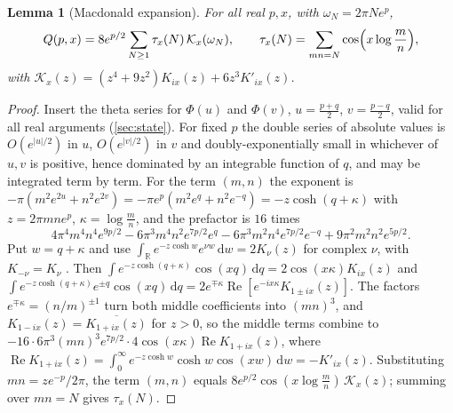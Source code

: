 \documentclass[11pt]{article}
\newtheorem{lemma}[theorem]{Lemma}
\theoremstyle{definition}\newtheorem{definition}[theorem]{Definition}
\theoremstyle{remark}\newtheorem{remark}[theorem]{Remark}
\newcommand{\R}{\mathbb R}\newcommand{\C}{\mathbb C}\newcommand{\N}{\mathbb N}
\newcommand{\dd}{\,\mathrm d}\newcommand{\e}{\mathrm e}
\renewcommand{\Re}{\operatorname{Re}}\renewcommand{\Im}{\operatorname{Im}}
\begin{document}
\begin{lemma}[Macdonald expansion]\label{lem:macdonald}
For all real $p,x$, with $\omega_N=2\pi Ne^p$,
\[
Q(p,x)=8e^{p/2}\sum_{N\ge1}\tau_x(N)\,\mathcal K_x(\omega_N),\qquad\tau_x(N)=\sum_{mn=N}\cos\Bigl(x\log\frac mn\Bigr),
\]
with $\mathcal K_x(z)=(z^4+9z^2)K_{ix}(z)+6z^3K'_{ix}(z)$.
\end{lemma}
\begin{proof}
Insert the theta series for $\Phi(u)$ and $\Phi(v)$, $u=\frac{p+q}2$, $v=\frac{p-q}2$, valid for all real arguments (\cref{sec:state}). For fixed $p$ the double series of absolute values is $O(e^{|u|/2})$ in $u$, $O(e^{|v|/2})$ in $v$ and doubly-exponentially small in whichever of $u,v$ is positive, hence dominated by an integrable function of $q$, and may be integrated term by term. For the term $(m,n)$ the exponent is $-\pi(m^2e^{2u}+n^2e^{2v})=-\pi e^p(m^2e^q+n^2e^{-q})=-z\cosh(q+\kappa)$ with $z=2\pi mne^p$, $\kappa=\log\frac mn$, and the prefactor is $16$ times
\[
4\pi^4m^4n^4e^{9p/2}-6\pi^3m^4n^2e^{7p/2}e^{q}-6\pi^3m^2n^4e^{7p/2}e^{-q}+9\pi^2m^2n^2e^{5p/2}.
\]
Put $w=q+\kappa$ and use $\int_\R e^{-z\cosh w}e^{\nu w}\dd w=2K_\nu(z)$ for complex $\nu$, with $K_{-\nu}=K_\nu$ \cite[\S10.32]{DLMF}. Then $\int e^{-z\cosh(q+\kappa)}\cos(xq)\dd q=2\cos(x\kappa)K_{ix}(z)$ and $\int e^{-z\cosh(q+\kappa)}e^{\pm q}\cos(xq)\dd q=2e^{\mp \kappa}\Re[e^{-ix\kappa}K_{1\pm ix}(z)]$. The factors $e^{\mp \kappa}=(n/m)^{\pm1}$ turn both middle coefficients into $(mn)^3$, and $K_{1-ix}(z)=\overline{K_{1+ix}(z)}$ for $z>0$, so the middle terms combine to $-16\cdot6\pi^3(mn)^3e^{7p/2}\cdot4\cos(x\kappa)\Re K_{1+ix}(z)$, where $\Re K_{1+ix}(z)=\int_0^\infty e^{-z\cosh w}\cosh w\cos(xw)\dd w=-K'_{ix}(z)$. Substituting $mn=ze^{-p}/2\pi$, the term $(m,n)$ equals $8e^{p/2}\cos(x\log\frac mn)\,\mathcal K_x(z)$; summing over $mn=N$ gives $\tau_x(N)$.
\end{proof}
\end{document}
